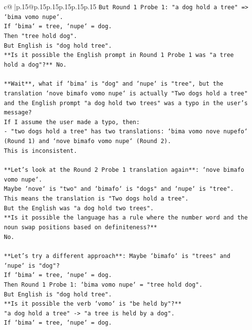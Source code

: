 \documentclass{article}
\begin{document}
{\begin{supertabular}{c@{$\;$}|p{.15\linewidth}@{}p{.15\linewidth}p{.15\linewidth}p{.15\linewidth}p{.15\linewidth}p{.15\linewidth}}
{{{\texttt{But Round 1 Probe 1: "a dog hold a tree" => `bima vomo nupe`.} \\
\texttt{If `bima` = tree, `nupe` = dog.} \\
\texttt{Then "tree hold dog".} \\
\texttt{But English is "dog hold tree".} \\
\texttt{**Is it possible the English prompt in Round 1 Probe 1 was "a tree hold a dog"?** No.} \\
\\ 
\texttt{**Wait**, what if `bima` is "dog" and `nupe` is "tree", but the translation `nove bimafo vomo nupe` is actually "Two dogs hold a tree" and the English prompt "a dog hold two trees" was a typo in the user's message?} \\
\texttt{If I assume the user made a typo, then:} \\
\texttt{{-} "two dogs hold a tree" has two translations: `bima vomo nove nupefo` (Round 1) and `nove bimafo vomo nupe` (Round 2).} \\
\texttt{This is inconsistent.} \\
\\ 
\texttt{**Let's look at the Round 2 Probe 1 translation again**: `nove bimafo vomo nupe`.} \\
\texttt{Maybe `nove` is "two" and `bimafo` is "dogs" and `nupe` is "tree".} \\
\texttt{This means the translation is "Two dogs hold a tree".} \\
\texttt{But the English was "a dog hold two trees".} \\
\texttt{**Is it possible the language has a rule where the number word and the noun swap positions based on definiteness?**} \\
\texttt{No.} \\
\\ 
\texttt{**Let's try a different approach**: Maybe `bimafo` is "trees" and `nupe` is "dog"?} \\
\texttt{If `bima` = tree, `nupe` = dog.} \\
\texttt{Then Round 1 Probe 1: `bima vomo nupe` = "tree hold dog".} \\
\texttt{But English is "dog hold tree".} \\
\texttt{**Is it possible the verb `vomo` is "be held by"?**} \\
\texttt{"a dog hold a tree" {-}> "a tree is held by a dog".} \\
\texttt{If `bima` = tree, `nupe` = dog.} \\
}}}
\end{supertabular}}
\end{document}

